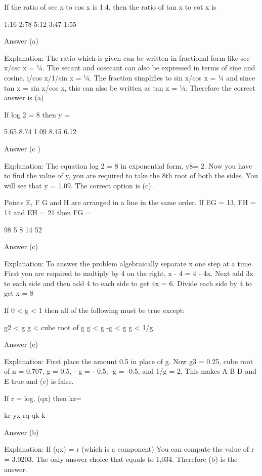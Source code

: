 

    If the ratio of sec x to cos x is 1:4, then the ratio of tan x to cot x is

        1:16
        2:78
        5:12
        3:47
        1:55 

    Answer (a)

    Explanation: The ratio which is given can be written in fractional form like sec x/csc x = ¼. The secant and cosecant can also be expressed in terms of sine and cosine. i/cos x/1/sin x = ¼. The fraction simplifies to sin x/cos x = ¼ and since tan x = sin x/cos x, this can also be written as tan x = ¼. Therefore the correct answer is (a)

    If log 2 = 8 then y =

        5.65
        8.74
        1.09
        8.45
        6.12 

    Answer (c )

    Explanation: The equation log 2 = 8 in exponential form, y8= 2. Now you have to find the value of y, you are required to take the 8th root of both the sides. You will see that y = 1.09. The correct option is (c).

    Points E, F G and H are arranged in a line in the same order. If EG = 13, FH = 14 and EH = 21 then FG =

        98
        5
        8
        14
        52 

    Answer (c)

    Explanation: To answer the problem algebraically separate x one step at a time. First you are required to multiply by 4 on the right, x - 4 = 4 - 4x. Next add 3x to each side and then add 4 to each side to get 4x = 6. Divide each side by 4 to get x = 8

    If 0 < g < 1 then all of the following must be true except:

        g2 < g
        g < cube root of g
        g < g
        -g < g
        g < 1/g 

    Answer (c)

    Explanation: First place the amount 0.5 in place of g. Now g3 = 0.25, cube root of n = 0.707, g = 0.5, - g = - 0.5, -g = -0.5, and 1/g = 2. This makes A B D and E true and (c) is false.

    If r = log, (qx) then kz=

        kr
        yx
        rq
        qk
        k 

    Answer (b)

    Explanation: If (qx) = r (which is a component) You can compute the value of r = 3.0203. The only answer choice that equals to 1,034. Therefore (b) is the answer.

